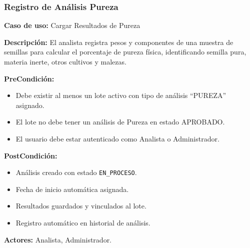 \subsubsection{Registro de Análisis Pureza}

\noindent\textbf{Caso de uso:} Cargar Resultados de Pureza

\vspace{0.5em}
\noindent\textbf{Descripción:} El analista registra pesos y componentes de una muestra de semillas para calcular el porcentaje de pureza física, identificando semilla pura, materia inerte, otros cultivos y malezas.

\vspace{0.5em}
\noindent\textbf{PreCondición:}
\begin{itemize}[nosep]
    \item Debe existir al menos un lote activo con tipo de análisis ``PUREZA'' asignado.
    \item El lote no debe tener un análisis de Pureza en estado APROBADO.
    \item El usuario debe estar autenticado como Analista o Administrador.
\end{itemize}

\vspace{0.5em}
\noindent\textbf{PostCondición:}
\begin{itemize}[nosep]
    \item Análisis creado con estado \texttt{EN\_PROCESO}.
    \item Fecha de inicio automática asignada.
    \item Resultados guardados y vinculados al lote.
    \item Registro automático en historial de análisis.
\end{itemize}

\vspace{0.5em}
\noindent\textbf{Actores:} Analista, Administrador.

